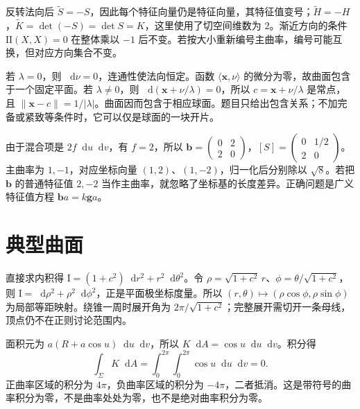\documentclass[UTF8,12pt,a4paper,fontset=fandol]{ctexbook}
\newcommand{\dd}{\mathop{}\!\mathrm d}
\newcommand{\ip}[2]{\langle #1,#2\rangle}
\newcommand{\norm}[1]{\lVert #1\rVert}
\begin{document}
\begin{solve}
反转法向后 $\widetilde S=-S$，因此每个特征向量仍是特征向量，其特征值变号；$\widetilde H=-H$，$\widetilde K=\det(-S)=\det S=K$，这里使用了切空间维数为 $2$。渐近方向的条件 $\mathrm{II}(X,X)=0$ 在整体乘以 $-1$ 后不变。若按大小重新编号主曲率，编号可能互换，但对应方向集合不变。
\end{solve}

\begin{solve}
若 $\lambda=0$，则 $\dd\nu=0$，连通性使法向恒定。函数 $\ip{\mathbf x}\nu$ 的微分为零，故曲面包含于一个固定平面。若 $\lambda\ne0$，则 $\dd(\mathbf x+\nu/\lambda)=0$，所以 $c=\mathbf x+\nu/\lambda$ 是常点，且 $\norm{\mathbf x-c}=1/|\lambda|$。曲面因而包含于相应球面。题目只给出包含关系；不加完备或紧致等条件时，它可以仅是球面的一块开片。
\end{solve}

\begin{solve}
由于混合项是 $2f\dd u\dd v$，有 $f=2$，所以 $\mathbf b=\begin{pmatrix}0&2\\2&0\end{pmatrix}$，$[S]=\begin{pmatrix}0&1/2\\2&0\end{pmatrix}$。主曲率为 $1,-1$，对应坐标向量 $(1,2)$、$(1,-2)$，归一化后分别除以 $\sqrt8$。若把 $\mathbf b$ 的普通特征值 $2,-2$ 当作主曲率，就忽略了坐标基的长度差异。正确问题是广义特征值方程 $\mathbf b a=k\mathbf g a$。
\end{solve}

\section{典型曲面}
\begin{solve}
直接求内积得 $\mathrm I=(1+c^2)\dd r^2+r^2\dd\theta^2$。令 $\rho=\sqrt{1+c^2}\,r$、$\phi=\theta/\sqrt{1+c^2}$，则 $\mathrm I=\dd\rho^2+\rho^2\dd\phi^2$，正是平面极坐标度量。所以 $(r,\theta)\mapsto(\rho\cos\phi,\rho\sin\phi)$ 为局部等距映射。绕锥一周时展开角为 $2\pi/\sqrt{1+c^2}$；完整展开需切开一条母线，顶点仍不在正则讨论范围内。
\end{solve}

\begin{solve}
面积元为 $a(R+a\cos u)\dd u\dd v$，所以 $K\dd A=\cos u\dd u\dd v$。积分得
\[
 \int_\Sigma K\dd A=\int_0^{2\pi}\int_0^{2\pi}\cos u\dd u\dd v=0.
\]
正曲率区域的积分为 $4\pi$，负曲率区域的积分为 $-4\pi$，二者抵消。这是带符号的曲率积分为零，不是曲率处处为零，也不是绝对曲率积分为零。
\end{solve}
\end{document}

